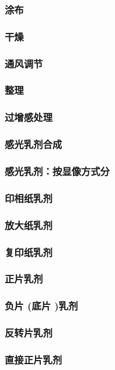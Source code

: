 \documentclass[UTF8]{../../ApplicationUniverse}
\begin{document}
    \subsubsection{涂布}
    \subsubsection{干燥}
    \subsubsection{通风调节}
    \subsubsection{整理}
    \subsubsection{过增感处理}
\subsubsection{感光乳剂合成}
    \subsubsection{感光乳剂：按显像方式分}
        \subsubsection{印相纸乳剂}
        \subsubsection{放大纸乳剂}
        \subsubsection{复印纸乳剂}
        \subsubsection{正片乳剂}
        \subsubsection{负片 (底片 )乳剂}
        \subsubsection{反转片乳剂}
        \subsubsection{直接正片乳剂}
\end{document}
